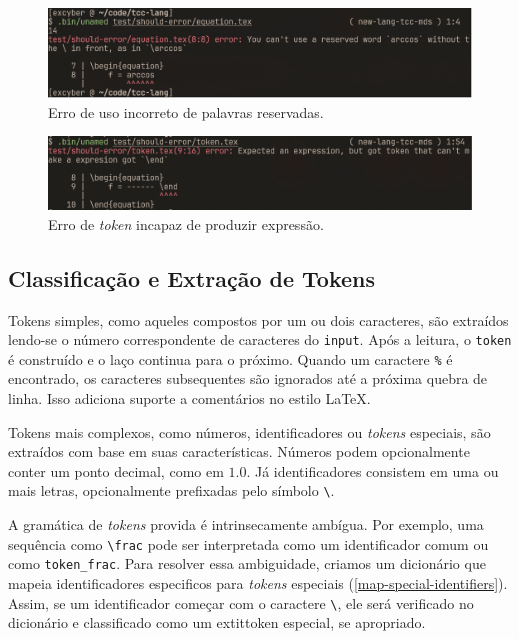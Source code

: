 \begin{figure}[H]
    \caption{\label{error-reserved-word} \small Erro de uso incorreto de palavras reservadas.}
    \begin{center}
        \includegraphics[scale=0.5]{./Imagens/error-reserved-word.png}
    \end{center}
\end{figure}


\begin{figure}[H]
    \caption{\label{error-cant-make-expression} \small Erro de \textit{token} incapaz de produzir expressão.}
    \begin{center}
        \includegraphics[scale=0.5]{./Imagens/error-cant-make-expression.png}
    \end{center}
\end{figure}


\subsection{Classificação e Extração de Tokens}


Tokens simples, como aqueles compostos por um ou dois caracteres, são extraídos lendo-se o número correspondente de caracteres do \texttt{input}. Após a leitura, o \texttt{token} é construído e o laço continua para o próximo. Quando um caractere \texttt{\%} é encontrado, os caracteres subsequentes são ignorados até a próxima quebra de linha. Isso adiciona suporte a comentários no estilo \LaTeX{}.

Tokens mais complexos, como números, identificadores ou \textit{tokens} especiais, são extraídos com base em suas características. Números podem opcionalmente conter um ponto decimal, como em $1.0$. Já identificadores consistem em uma ou mais letras, opcionalmente prefixadas pelo símbolo \verb|\|.

A gramática de \textit{tokens} provida é intrinsecamente ambígua. Por exemplo, uma sequência como \verb|\frac| pode ser interpretada como um identificador comum ou como \verb"token_frac". Para resolver essa ambiguidade, criamos um dicionário que mapeia identificadores especificos para \textit{tokens} especiais (\autoref{map-special-identifiers}). Assim, se um identificador começar com o caractere \verb|\|, ele será verificado no dicionário e classificado como um 	extit{token} especial, se apropriado.


